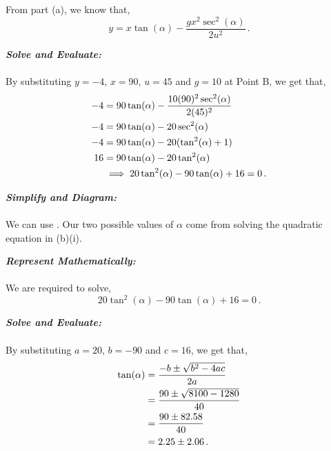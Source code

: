 \begin{subquestions}
\begin{subsubquestions}
From part (a), we know that,
\begin{equation}
	y = x\tan(\alpha) - \frac{gx^2\sec^2(\alpha)}{2u^2} \,.
\end{equation}




\textbf{\textit{Solve and Evaluate:}} \\ \\
By substituting $y=-4$, $x=90$, $u=45$ and $g=10$ at Point B, we get that,
\begin{align}
	-4 & = 90\tan(\alpha) - \frac{10(90)^2\sec^2(\alpha)}{2(45)^2} \nonumber \\
	-4 & = 90\tan(\alpha) - 20\sec^2(\alpha) \nonumber \\
	-4 & = 90\tan(\alpha) - 20(\tan^2(\alpha)+1) \nonumber \\
	16 & = 90\tan(\alpha) - 20\tan^2(\alpha) \nonumber \\
	&\implies 20\tan^2(\alpha)-90\tan(\alpha)+16 = 0 \,.
\end{align}


\subsubquestion

\textbf{\textit{Simplify and Diagram:}} \\ \\
We can use . Our two possible values of $\alpha$ come from solving the quadratic equation in (b)(i).
	
	
	
	
\textbf{\textit{Represent Mathematically:}} \\ \\
We are required to solve,
\begin{equation}
	20\tan^2(\alpha)-90\tan(\alpha)+16 = 0 \,.
\end{equation}
	
	
	
	
\textbf{\textit{Solve and Evaluate:}} \\ \\
By substituting $a=20$, $b=-90$ and $c=16$, we get that,
\begin{align}
	\tan(\alpha) & = \frac{-b \pm \sqrt{b^2-4ac}}{2a} \nonumber \\
	             & = \frac{90 \pm \sqrt{8100-1280}}{40} \nonumber \\
	             & = \frac{90 \pm 82.58}{40} \nonumber \\
	             & = 2.25 \pm 2.06 \,.
\end{align}
	

\end{subsubquestions}
\end{subquestions}

